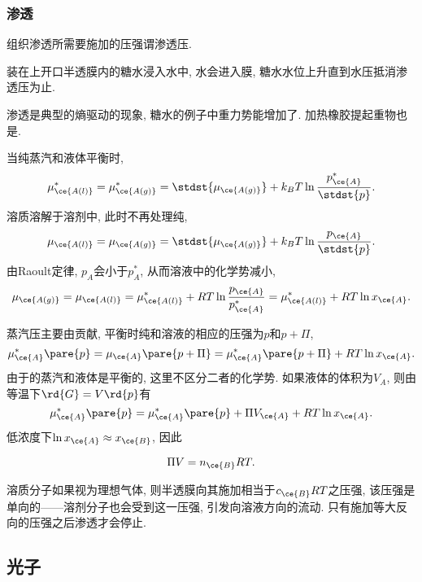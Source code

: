 \documentclass[../Thermal.tex]{subfiles}
\begin{document}
\subsubsection{渗透}
\begin{definition}[渗透压]
组织渗透所需要施加的压强谓渗透压.
\end{definition}
\begin{ex}
装在上开口半透膜内的糖水浸入水中, 水会进入膜, 糖水水位上升直到水压抵消渗透压为止.
\end{ex}
\begin{remark}
渗透是典型的熵驱动的现象, 糖水的例子中重力势能增加了. 加热橡胶提起重物也是.
\end{remark}
\begin{ex}[溶剂化学势]
当纯蒸汽和液体平衡时,
\[ \mu_{\ce{A(l)}}^* = \mu_{\ce{A(g)}}^* = \stdst{\mu_{\ce{A(g)}}} + k_BT\ln\frac{p_{\ce{A}}^*}{\stdst{p}}. \]
溶质溶解于溶剂中, 此时不再处理纯,
\[ \mu_{\ce{A(l)}} = \mu_{\ce{A(g)}} = \stdst{\mu_{\ce{A(g)}}} + k_BT\ln\frac{p_{\ce{A}}}{\stdst{p}}. \]
由Raoult定律, $p_A$会小于$p_A^*$, 从而溶液中的化学势减小,
\begin{equation}
\label{eq:musolutionbymupure}
\mu_{\ce{A(g)}} = \mu_{\ce{A(l)}} = \mu_{\ce{A(l)}}^* + RT\ln\frac{p_{\ce{A}}}{p_{\ce{A}}^*} = \mu_{\ce{A(l)}}^* + RT\ln x_{\ce{A}}.
\end{equation}
\end{ex}
蒸汽压主要由贡献, 平衡时纯和溶液的相应的压强为$p$和$p+\Pi$,
\[ \mu_{\ce{A}}^*\pare{p} = \mu_{\ce{A}}\pare{p+\Pi} = \mu_{\ce{A}}^*\pare{p+\Pi} + RT\ln x_{\ce{A}}. \]
由于的蒸汽和液体是平衡的, 这里不区分二者的化学势. 如果液体的体积为$V_A$, 则由等温下$\rd{G} = V\rd{p}$有
\[ \mu_{\ce{A}}^*\pare{p} = \mu_{\ce{A}}^*\pare{p} + \Pi V_{\ce{A}} + RT\ln x_{\ce{A}}. \]
低浓度下$\ln x_{\ce{A}}\approx x_{\ce{B}}$, 因此
\begin{finale}
\[ \Pi V = n_{\ce{B}}RT. \]
\end{finale}
\begin{remark}
溶质分子如果视为理想气体, 则半透膜向其施加相当于$c_{\ce{B}}RT$之压强, 该压强是单向的——溶剂分子也会受到这一压强, 引发向溶液方向的流动. 只有施加等大反向的压强之后渗透才会停止.
\end{remark}
\subsection{光子}
\end{document}
